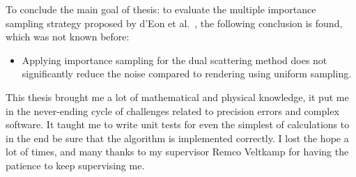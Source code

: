 \documentclass[11pt,a4paper]{report}
\begin{document}
To conclude the main goal of thesis: to evaluate the multiple importance sampling strategy proposed by d'Eon et al.~\cite{eon2011}, the following conclusion is found, which was not known before:

\begin{itemize}
\item Applying importance sampling for the dual scattering method does not significantly reduce the noise compared to rendering using uniform sampling.
\end{itemize}

This thesis brought me a lot of mathematical and physical knowledge, it put me in the never-ending cycle of challenges related to precision errors and complex software. It taught me to write unit tests for even the simplest of calculations to in the end be sure that the algorithm is implemented correctly. I lost the hope a lot of times, and many thanks to my supervisor Remco Veltkamp for having the patience to keep supervising me.





\end{document}
